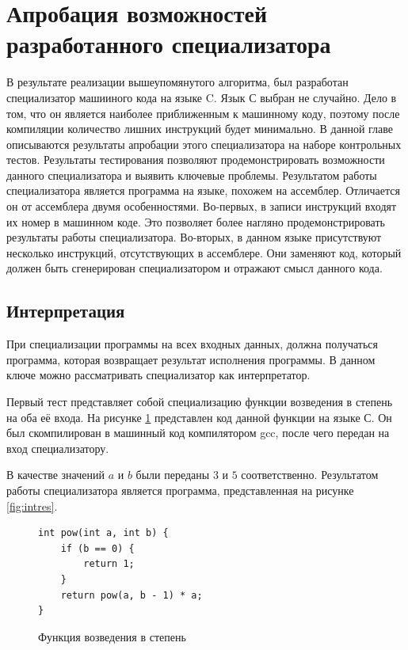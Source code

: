 \section{Апробация возможностей разработанного специализатора}
В результате реализации вышеупомянутого алгоритма, был разработан специализатор машииного кода на языке C. Язык С выбран не случайно. Дело в том, что он является наиболее приближенным к машинному коду, поэтому после компиляции количество лишних инструкций будет минимально. В данной главе описываются результаты апробации этого специализатора на наборе контрольных тестов. Результаты тестирования позволяют продемонстрировать возможности данного специализатора и выявить ключевые проблемы.
Результатом работы специализатора является программа на языке, похожем на ассемблер. Отличается он от ассемблера двумя особенностями. Во-первых, в записи инструкций входят их номер в машинном коде. Это позволяет более нагляно продемонстрировать результаты работы специализатора. Во-вторых, в данном языке присутствуют несколько инструкций, отсутствующих в ассемблере. Они заменяют код, который должен быть сгенерирован специализатором и отражают смысл данного кода.

\subsection{ Интерпретация}
При специализации программы на всех входных данных, должна получаться программа, которая возвращает результат исполнения программы. В данном ключе можно рассматривать специализатор как интерпретатор.

Первый тест представляет собой специализацию функции возведения в степень на оба её входа. На рисунке \ref{fig:int} представлен код данной функции на языке С. Он был скомпилирован в машинный код компилятором gcc, после чего передан на вход специализатору.

В качестве значений $a$ и $b$ были переданы $3$ и $5$ соответственно. Результатом работы специализатора является программа, представленная на рисунке \ref{fig:intres}.

\begin{figure}
\begin{lstlisting}[xleftmargin = 20pt]
int pow(int a, int b) {
    if (b == 0) {
        return 1;
    }
    return pow(a, b - 1) * a;
}
\end{lstlisting}
\caption{ Функция возведения в степень}
\label{fig:int}
\end{figure}

